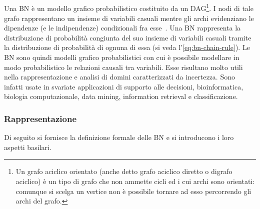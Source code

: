 \subsection{\bn{}}\label{subsec:bn}
Una \acl{BN} è un modello grafico probabilistico costituito da un \acf{DAG}\footnote{\label{note:DAG}Un grafo aciclico orientato (anche detto grafo aciclico diretto o digrafo aciclico) è un tipo di grafo che non ammette cicli ed i cui archi sono orientati: comunque si scelga un vertice non è possibile tornare ad esso percorrendo gli archi del grafo.}. I nodi di tale grafo rappresentano un insieme di variabili casuali mentre gli archi evidenziano le dipendenze (e le indipendenze) condizionali fra esse~\citep{Korb2011}.
Una \acs{BN} rappresenta la distribuzione di probabilità congiunta del suo insieme di variabili casuali tramite la distribuzione di probabilità \cond*{} di ognuna di essa (si veda l'\autoref{eq:bn-chain-rule}).
Le \acs{BN} sono quindi modelli grafico probabilistici con cui è possibile modellare in modo probabilistico le relazioni causali tra variabili. Esse risultano molto utili nella rappresentazione e analisi di domini caratterizzati da incertezza. Sono infatti usate in svariate applicazioni di supporto alle decisioni, bioinformatica, biologia computazionale, data mining, information retrieval e classificazione.

\subsubsection{Rappresentazione}\label{subsec:bn-representation}
Di seguito si fornisce la definizione formale delle \acl{BN} e si introducono i loro aspetti basilari.

